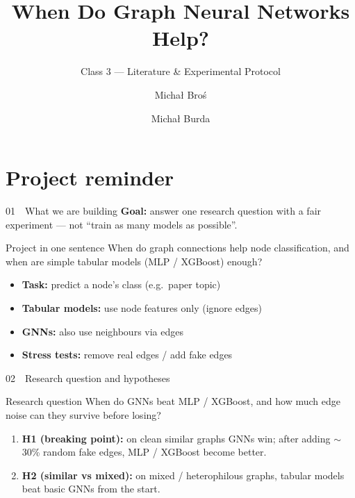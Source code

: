 \documentclass[
  english,
  aspectratio=169,
]{beamer}
\title[When Do GNNs Help?]{When Do Graph Neural Networks Help?}
\subtitle{Class 3 --- Literature \& Experimental Protocol}
\author[M.~Bro\'{s} \& M.~Burda]{%
  Micha\l{} Bro\'{s}\inst{1}
  \and
  Micha\l{} Burda\inst{1}
}
\institute[AGH]{%
  \inst{1}%
  Computational Intelligence \\
  Prof.~Adrian Horzyk \\
  AGH University of Krakow
}
\date{} %
\begin{document}
\begin{frame}[plain]
  \titlepage
\end{frame}

\section{Project reminder}

\begin{frame}{01~~What we are building}
  \textbf{Goal:} answer one research question with a fair experiment ---
  not ``train as many models as possible''.

  \vspace{0.6em}
  \begin{block}{Project in one sentence}
    When do graph connections help node classification,
    and when are simple tabular models (MLP / XGBoost) enough?
  \end{block}

  \begin{itemize}
    \item \textbf{Task:} predict a node's class (e.g.\ paper topic)
    \item \textbf{Tabular models:} use node features only (ignore edges)
    \item \textbf{GNNs:} also use neighbours via edges
    \item \textbf{Stress tests:} remove real edges / add fake edges
  \end{itemize}
\end{frame}

\begin{frame}{02~~Research question and hypotheses}
  \begin{block}{Research question}
    When do GNNs beat MLP / XGBoost, and how much edge noise
    can they survive before losing?
  \end{block}

  \begin{enumerate}
    \item \textbf{H1 (breaking point):}
      on clean similar graphs GNNs win;
      after adding $\sim$30\% random fake edges, MLP / XGBoost become better.
    \item \textbf{H2 (similar vs mixed):}
      on mixed / heterophilous graphs, tabular models beat basic GNNs
      from the start.
  \end{enumerate}
\end{frame}
\end{document}
